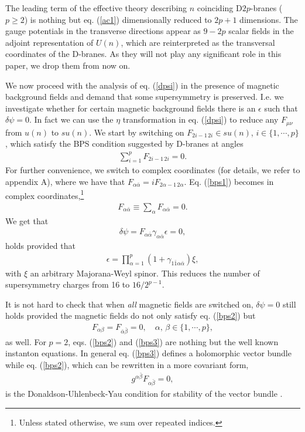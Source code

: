 \documentclass[a4paper,12pt,oneside]{article}
\begin{document}
The leading term of the effective theory describing $n$ coinciding 
D$2p$-branes ($p\geq 2$) is nothing but eq. (\ref{ac1}) dimensionally reduced to 
$2p+1$ dimensions. The gauge potentials in the transverse directions appear
as $9-2p$ scalar fields in the adjoint representation of $U(n)$,
which are reinterpreted as the transversal coordinates of the D-branes. 
As they will not play any significant role in this paper, we drop them
from now on.

We now proceed with the analysis of eq. (\ref{dpsi}) in the presence of 
magnetic background fields and demand that some supersymmetry is preserved. 
I.e. we investigate whether for certain magnetic background fields there 
is an $\epsilon $ such that $\delta\psi=0$. In fact we can use the $\eta$ 
transformation in eq. (\ref{dpsi}) to reduce any $F_{\mu \nu}$ from $u(n)$ 
to $su(n)$.
We start by switching on $F_{2i-1\,2i}\in su(n)$, $i\in\{1,\cdots,p\}$, 
which satisfy the BPS condition suggested by D-branes at angles
\begin{eqnarray}
\sum_{i=1}^pF_{2i-1\,2i}=0.\label{bps1}
\end{eqnarray}
For further convenience, 
we switch to complex coordinates (for details, we refer to appendix A),
where we have that $F_{\alpha \bar\alpha }=iF_{2\alpha -1\,2\alpha }$. 
Eq. (\ref{bps1}) becomes in complex coordinates,\footnote{Unless
stated otherwise, we sum over repeated indices.}
\begin{eqnarray}
F_{\alpha \bar\alpha }\equiv\sum_{\alpha } F_{\alpha \bar\alpha } =0.  \label{bps2}
\end{eqnarray}
We get that
\begin{eqnarray}
\delta\psi =F_{\alpha \bar\alpha }\gamma_{\alpha \bar\alpha }\epsilon=0,
\end{eqnarray}
holds provided that
\begin{eqnarray}
\epsilon=\prod_{\alpha =1}^p(1+\gamma_{1\bar 1\alpha \bar\alpha })\xi,
\end{eqnarray}
with $\xi$ an arbitrary Majorana-Weyl spinor. This reduces the number of 
supersymmetry charges from 16 to $16/2^{p-1}$.

It is not hard to check that when {\em all} magnetic fields are switched 
on, $\delta\psi =0$ still holds provided the magnetic fields do not only 
satisfy eq. (\ref{bps2}) but
\begin{eqnarray}
F_{\alpha \beta}=F_{\bar\alpha \bar\beta}=0,\quad \alpha 
,\,\beta\in\{1,\cdots,p\},  \label{bps3}
\end{eqnarray}
as well. For $p=2$, eqs. (\ref{bps2}) and (\ref{bps3}) are nothing 
but the well known instanton equations. In general eq. (\ref{bps3}) 
defines a holomorphic vector bundle while eq. (\ref{bps2}), which can be 
rewritten in a more covariant form,
\begin{eqnarray}
g^{\alpha \bar\beta}F_{\alpha \bar\beta}=0,
\end{eqnarray}
is the Donaldson-Uhlenbeck-Yau condition for stability of the vector
bundle \cite{GSW}.
\end{document}
